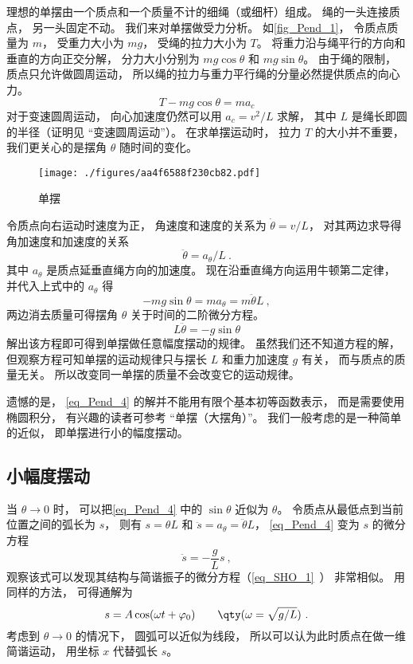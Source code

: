 

理想的单摆由一个质点和一个质量不计的细绳（或细杆）组成。 绳的一头连接质点， 另一头固定不动。 我们来对单摆做受力分析。 如\autoref{fig_Pend_1}， 令质点质量为 $m$， 受重力大小为 $mg$， 受绳的拉力大小为 $T$。 将重力沿与绳平行的方向和垂直的方向正交分解， 分力大小分别为 $mg\cos\theta$ 和 $mg\sin\theta$。 由于绳的限制， 质点只允许做圆周运动， 所以绳的拉力与重力平行绳的分量必然提供质点的向心力。
\begin{equation}
T - mg\cos\theta = ma_c
\end{equation}
对于变速圆周运动， 向心加速度仍然可以用 $a_c = v^2/L$ 求解， 其中 $L$ 是绳长即圆的半径（证明见 “变速圆周运动”）。%
在求单摆运动时， 拉力 $T$ 的大小并不重要， 我们更关心的是摆角 $\theta$ 随时间的变化。
\begin{figure}[ht]
\centering
\texttt{[image: ./figures/aa4f6588f230cb82.pdf]}
\caption{单摆} \label{fig_Pend_1}
\end{figure}

令质点向右运动时速度为正， 角速度和速度的关系为 $\dot\theta = v/L$， 对其两边求导得角加速度和加速度的关系
\begin{equation}
\ddot\theta = a_\theta/L~.
\end{equation}
其中 $a_\theta$ 是质点延垂直绳方向的加速度。 现在沿垂直绳方向运用牛顿第二定律， 并代入上式中的 $a_\theta$ 得
\begin{equation}
-mg\sin\theta = ma_\theta = m\ddot\theta L~,
\end{equation}
两边消去质量可得摆角 $\theta$ 关于时间的二阶微分方程。
\begin{equation}\label{eq_Pend_4}
L\ddot\theta = - g\sin\theta
\end{equation}
解出该方程即可得到单摆做任意幅度摆动的规律。 虽然我们还不知道方程的解， 但观察方程可知单摆的运动规律只与摆长 $L$ 和重力加速度 $g$ 有关， 而与质点的质量无关。 所以改变同一单摆的质量不会改变它的运动规律。

遗憾的是， \autoref{eq_Pend_4} 的解并不能用有限个基本初等函数表示， 而是需要使用椭圆积分， 有兴趣的读者可参考 “单摆（大摆角）”。 我们一般考虑的是一种简单的近似， 即单摆进行小的幅度摆动。

\subsection{小幅度摆动}
当 $\theta \to 0$ 时， 可以把\autoref{eq_Pend_4} 中的 $\sin\theta$ 近似为 $\theta$。 令质点从最低点到当前位置之间的弧长为 $s$， 则有 $s = \theta L$ 和 $\ddot s = a_\theta = \ddot\theta L$， \autoref{eq_Pend_4} 变为 $s$ 的微分方程
\begin{equation}
\ddot s = - \frac gL s~,
\end{equation}
观察该式可以发现其结构与简谐振子的微分方程（\autoref{eq_SHO_1}~） 非常相似。 用同样的方法， 可得通解为
\begin{equation}
s = A\cos(\omega t + \varphi_0)  \qquad \qty(\omega  = \sqrt{g/L})~.
\end{equation}
考虑到 $\theta \to 0$ 的情况下， 圆弧可以近似为线段， 所以可以认为此时质点在做一维简谐运动， 用坐标 $x$ 代替弧长 $s$。
